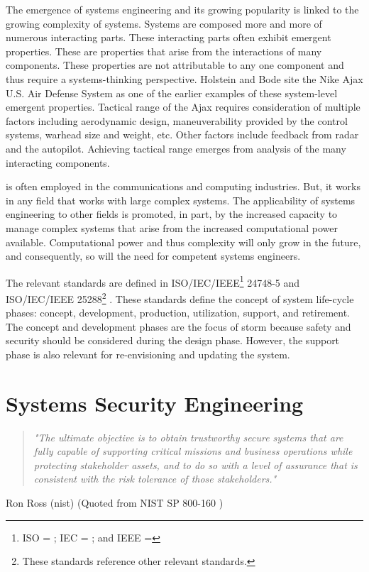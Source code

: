 \documentclass[../../main/main.tex]{subfiles}
\begin{document}
The emergence of systems engineering and its growing popularity is linked to the growing complexity of systems.  Systems are composed more and more of numerous interacting parts.  These interacting parts often exhibit emergent properties.  These are properties that arise from the interactions of many components.  These properties are not attributable to any one component and thus require a systems-thinking perspective. Holstein and Bode site the Nike Ajax U.S. Air Defense System as one of the earlier examples of these system-level emergent properties. Tactical range of the Ajax requires consideration of multiple factors including aerodynamic design, maneuverability provided by the control systems, warhead size and weight, etc.  Other factors include feedback from radar and the autopilot.  Achieving tactical range emerges from analysis of the many interacting components.  

 is often employed in the communications and computing industries. But, it works in any field that works with large complex systems.  The applicability of systems engineering to other fields is promoted, in part, by the increased capacity to manage complex systems that arise from the increased computational power available.  Computational power and thus complexity will only grow in the future, and consequently, so will the need for competent systems engineers.

The relevant  standards are defined in ISO/IEC/IEEE\footnote{ISO = ; IEC = ; and IEEE = } 24748-5 \cite{iso247482017} and ISO/IEC/IEEE 25288\footnote{These standards reference other relevant standards.} \cite{iso15288}.  These standards define the concept of system life-cycle phases: concept, development, production, utilization, support, and retirement.  The concept and development phases are the focus of \gls{storm} because safety and security should be considered during the design phase.  However, the support phase is also relevant for re-envisioning and updating the system.  

\section{Systems Security Engineering}\label{sesc:sse}
\begin{quote}
\textit{"The ultimate objective is to obtain trustworthy secure systems that are fully capable of supporting critical missions and business operations while protecting stakeholder assets, and to do so with a level of assurance that is consistent with the risk tolerance of those stakeholders."}
\end{quote}
\begin{flushright} Ron Ross (\gls{nist}) (Quoted from NIST SP 800-160 \cite{NIST800160}) \end{flushright} 
\end{document}
